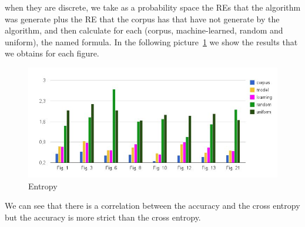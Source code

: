 when they are discrete, we take as a probability space the REs that the algorithm was generate plus the RE that the corpus has that have not generate by the algorithm, and then calculate for each (corpus, machine-learned, random and uniform), the named formula. In the following picture~\ref{Entropy} we show the results that we obtains for each figure.
\begin{figure}[ht]
\begin{minipage}[b]{0.70\linewidth}
\includegraphics[width=\textwidth]{images/entropy.jpg}
\vspace*{.15cm}
\caption{Entropy}
\label{Entropy}
\end{minipage}
\end{figure}

We can see that there is a correlation between the accuracy and the cross entropy but the accuracy is more strict than the cross entropy.

